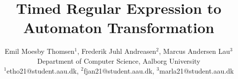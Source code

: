 \documentclass{article}
\begin{document}


\title{Timed Regular Expression to Automaton Transformation}


\author{Emil Moesby Thomsen$^1$, Frederik Juhl Andreasen$^2$, Marcus Andersen Lau$^3$\\
    \small{Department of Computer Science, Aalborg University}\\
    \small{$^1$etho21@student.aau.dk, $^2$fjan21@student.aau.dk, $^3$marla21@student.aau.dk}}
\maketitle

\begin{abstract}
    
\end{abstract}

\begin{multicols}{2}
    \raggedcolumns
    
    
    
    
    
    
\end{multicols}

\printbibliography{}
\end{document}
